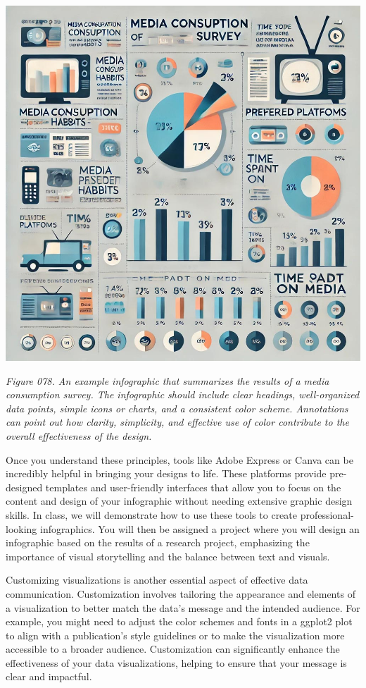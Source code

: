 \documentclass[
]{book}
\begin{document}
\includegraphics[width=1\textwidth,height=\textheight]{images/fig078.jpg}

\emph{Figure 078. An example infographic that summarizes the results of a media consumption survey. The infographic should include clear headings, well-organized data points, simple icons or charts, and a consistent color scheme. Annotations can point out how clarity, simplicity, and effective use of color contribute to the overall effectiveness of the design.}

Once you understand these principles, tools like Adobe Express or Canva can be incredibly helpful in bringing your designs to life. These platforms provide pre-designed templates and user-friendly interfaces that allow you to focus on the content and design of your infographic without needing extensive graphic design skills. In class, we will demonstrate how to use these tools to create professional-looking infographics. You will then be assigned a project where you will design an infographic based on the results of a research project, emphasizing the importance of visual storytelling and the balance between text and visuals.

Customizing visualizations is another essential aspect of effective data communication. Customization involves tailoring the appearance and elements of a visualization to better match the data's message and the intended audience. For example, you might need to adjust the color schemes and fonts in a ggplot2 plot to align with a publication's style guidelines or to make the visualization more accessible to a broader audience. Customization can significantly enhance the effectiveness of your data visualizations, helping to ensure that your message is clear and impactful.
\end{document}
